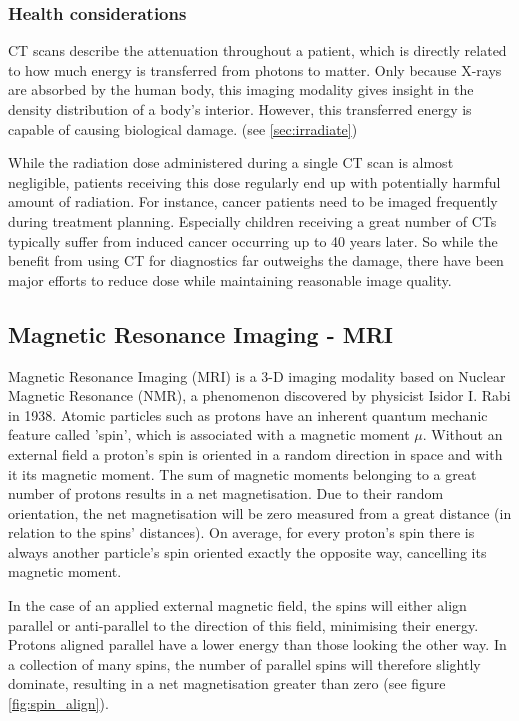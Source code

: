 \subsubsection{Health considerations}
CT scans describe the attenuation throughout a patient, which is directly related to how much energy is transferred from photons to matter.
Only because X-rays are absorbed by the human body, this imaging modality gives insight in the density distribution of a body's interior.
However, this transferred energy is capable of causing biological damage. (see \ref{sec:irradiate})

While the radiation dose administered during a single CT scan is almost negligible, patients receiving this dose regularly end up with potentially harmful amount of radiation.
For instance, cancer patients need to be imaged frequently during treatment planning.
Especially children receiving a great number of CTs typically suffer from induced cancer occurring up to 40 years later.
So while the benefit from using CT for diagnostics far outweighs the damage, there have been major efforts to reduce dose while maintaining reasonable image quality.
\cite{Murphy2007, Brenner2001, Sodickson2009, Smith2007, McCollough2009, Goldman2013}


\subsection{Magnetic Resonance Imaging - MRI}
Magnetic Resonance Imaging (MRI) is a 3-D imaging modality based on Nuclear Magnetic Resonance (NMR), a phenomenon discovered by physicist Isidor I. Rabi in 1938.
Atomic particles such as protons have an inherent quantum mechanic feature called 'spin', which is associated with a magnetic moment $\mu$.
Without an external field a proton's spin is oriented in a random direction in space and with it its magnetic moment.
The sum of magnetic moments belonging to a great number of protons results in a net magnetisation.
Due to their random orientation, the net magnetisation will be zero measured from a great distance (in relation to the spins' distances).
On average, for every proton's spin there is always another particle's spin oriented exactly the opposite way, cancelling its magnetic moment.

In the case of an applied external magnetic field, the spins will either align parallel or anti-parallel to the direction of this field, minimising their energy.
Protons aligned parallel have a lower energy than those looking the other way.
In a collection of many spins, the number of parallel spins will therefore slightly dominate, resulting in a net magnetisation greater than zero (see figure \ref{fig:spin_align}).

